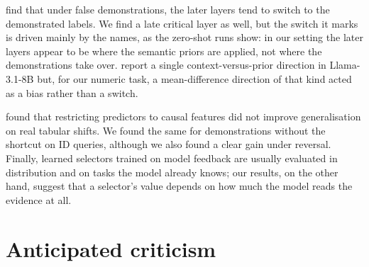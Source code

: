\citet{halawi2024overthinking} find that under false demonstrations, the later layers tend to switch to the demonstrated labels. We find a late critical layer as well, but the switch it marks is driven mainly by the names, as the zero-shot runs show: in our setting the later layers appear to be where the semantic priors are applied, not where the demonstrations take over. \citet{minder2025controllable} report a single context-versus-prior direction in Llama-3.1-8B but, for our numeric task, a mean-difference direction of that kind acted as a bias rather than a switch.

\citet{nastl2024causal} found that restricting predictors to causal features did not improve generalisation on real tabular shifts. We found the same for demonstrations without the shortcut on ID queries, although we also found a clear gain under reversal. Finally, learned selectors trained on model feedback \citep{rubin2022learning, ye2023compositional} are usually evaluated in distribution and on tasks the model already knows; our results, on the other hand, suggest that a selector's value depends on how much the model reads the evidence at all.

\section{Anticipated criticism}
\label{sec:criticism}

\subsection*{}



